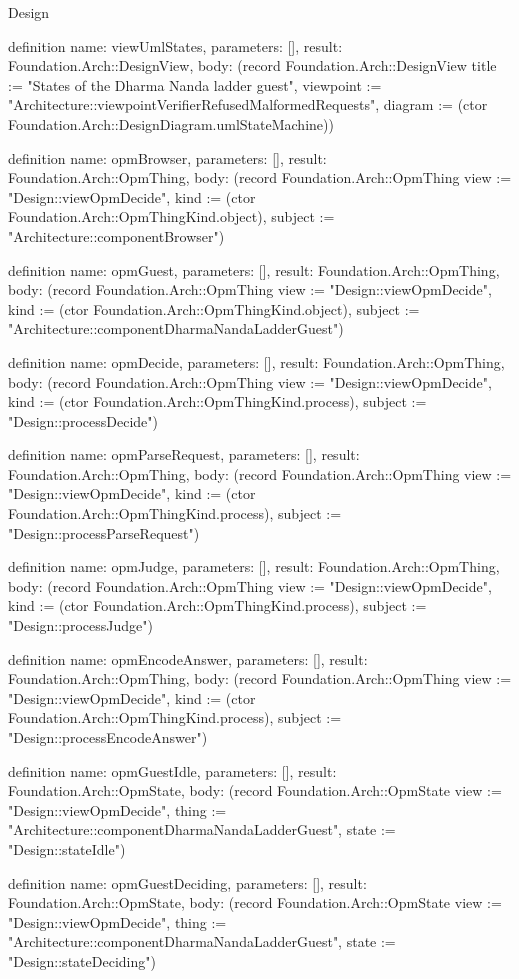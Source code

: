 \begin{lexlean}{Design}
\begin{semanticmodule}
definition{
  name: viewUmlStates,
  parameters: [],
  result: Foundation.Arch::DesignView,
  body: (record Foundation.Arch::DesignView {title := "States of the Dharma Nanda ladder guest", viewpoint := "Architecture::viewpointVerifierRefusedMalformedRequests", diagram := (ctor Foundation.Arch::DesignDiagram.umlStateMachine)})
}

definition{
  name: opmBrowser,
  parameters: [],
  result: Foundation.Arch::OpmThing,
  body: (record Foundation.Arch::OpmThing {view := "Design::viewOpmDecide", kind := (ctor Foundation.Arch::OpmThingKind.object), subject := "Architecture::componentBrowser"})
}

definition{
  name: opmGuest,
  parameters: [],
  result: Foundation.Arch::OpmThing,
  body: (record Foundation.Arch::OpmThing {view := "Design::viewOpmDecide", kind := (ctor Foundation.Arch::OpmThingKind.object), subject := "Architecture::componentDharmaNandaLadderGuest"})
}

definition{
  name: opmDecide,
  parameters: [],
  result: Foundation.Arch::OpmThing,
  body: (record Foundation.Arch::OpmThing {view := "Design::viewOpmDecide", kind := (ctor Foundation.Arch::OpmThingKind.process), subject := "Design::processDecide"})
}

definition{
  name: opmParseRequest,
  parameters: [],
  result: Foundation.Arch::OpmThing,
  body: (record Foundation.Arch::OpmThing {view := "Design::viewOpmDecide", kind := (ctor Foundation.Arch::OpmThingKind.process), subject := "Design::processParseRequest"})
}

definition{
  name: opmJudge,
  parameters: [],
  result: Foundation.Arch::OpmThing,
  body: (record Foundation.Arch::OpmThing {view := "Design::viewOpmDecide", kind := (ctor Foundation.Arch::OpmThingKind.process), subject := "Design::processJudge"})
}

definition{
  name: opmEncodeAnswer,
  parameters: [],
  result: Foundation.Arch::OpmThing,
  body: (record Foundation.Arch::OpmThing {view := "Design::viewOpmDecide", kind := (ctor Foundation.Arch::OpmThingKind.process), subject := "Design::processEncodeAnswer"})
}

definition{
  name: opmGuestIdle,
  parameters: [],
  result: Foundation.Arch::OpmState,
  body: (record Foundation.Arch::OpmState {view := "Design::viewOpmDecide", thing := "Architecture::componentDharmaNandaLadderGuest", state := "Design::stateIdle"})
}

definition{
  name: opmGuestDeciding,
  parameters: [],
  result: Foundation.Arch::OpmState,
  body: (record Foundation.Arch::OpmState {view := "Design::viewOpmDecide", thing := "Architecture::componentDharmaNandaLadderGuest", state := "Design::stateDeciding"})
}


\end{semanticmodule}
\end{lexlean}

